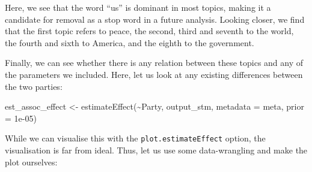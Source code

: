 \documentclass[
]{article}
\newenvironment{Shaded}{\begin{snugshade}}{\end{snugshade}}
\newcommand{\AttributeTok}[1]{\textcolor[rgb]{0.77,0.63,0.00}{#1}}
\newcommand{\FloatTok}[1]{\textcolor[rgb]{0.00,0.00,0.81}{#1}}
\newcommand{\FunctionTok}[1]{\textcolor[rgb]{0.00,0.00,0.00}{#1}}
\newcommand{\NormalTok}[1]{#1}
\newcommand{\OtherTok}[1]{\textcolor[rgb]{0.56,0.35,0.01}{#1}}
\newcommand{\SpecialCharTok}[1]{\textcolor[rgb]{0.00,0.00,0.00}{#1}}
\begin{document}
Here, we see that the word ``us'' is dominant in most topics, making it a candidate for removal as a stop word in a future analysis. Looking closer, we find that the first topic refers to peace, the second, third and seventh to the world, the fourth and sixth to America, and the eighth to the government.

Finally, we can see whether there is any relation between these topics and any of the parameters we included. Here, let us look at any existing differences between the two parties:

\begin{Shaded}
\begin{Highlighting}[]
\NormalTok{est\_assoc\_effect }\OtherTok{\textless{}{-}} \FunctionTok{estimateEffect}\NormalTok{(}\SpecialCharTok{\textasciitilde{}}\NormalTok{Party, output\_stm, }\AttributeTok{metadata =}\NormalTok{ meta,}
    \AttributeTok{prior =} \FloatTok{1e{-}05}\NormalTok{)}
\end{Highlighting}
\end{Shaded}

While we can visualise this with the \texttt{plot.estimateEffect} option, the visualisation is far from ideal. Thus, let us use some data-wrangling and make the plot ourselves:
\end{document}
